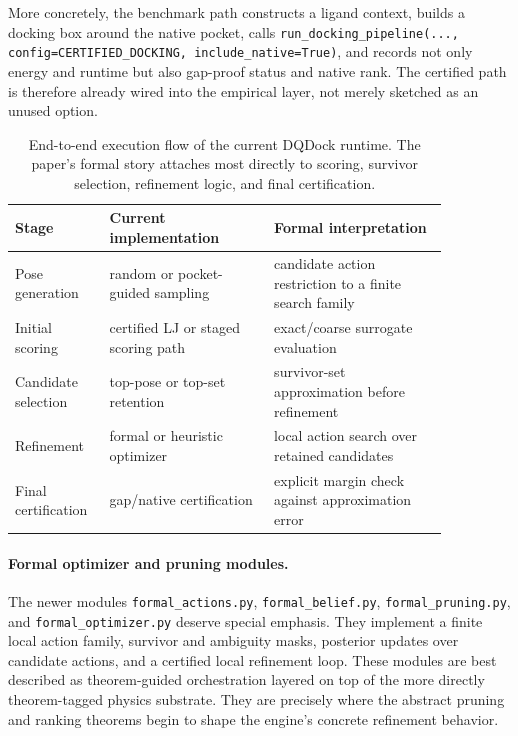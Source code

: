 More concretely, the benchmark path constructs a ligand context, builds a docking box around the native pocket, calls \texttt{run\_docking\_pipeline(..., config=CERTIFIED\_DOCKING, include\_native=True)}, and records not only energy and runtime but also gap-proof status and native rank. The certified path is therefore already wired into the empirical layer, not merely sketched as an unused option.

\begin{table}[t]
\centering
\small
\begin{tabular}{@{}p{0.16\linewidth}p{0.34\linewidth}p{0.36\linewidth}@{}}
\toprule
\textbf{Stage} & \textbf{Current implementation} & \textbf{Formal interpretation} \\
\midrule
Pose generation & random or pocket-guided sampling & candidate action restriction to a finite search family \\
Initial scoring & certified LJ or staged scoring path & exact/coarse surrogate evaluation \\
Candidate selection & top-pose or top-set retention & survivor-set approximation before refinement \\
Refinement & formal or heuristic optimizer & local action search over retained candidates \\
Final certification & gap/native certification & explicit margin check against approximation error \\
\bottomrule
\end{tabular}
\caption{End-to-end execution flow of the current DQDock runtime. The paper's formal story attaches most directly to scoring, survivor selection, refinement logic, and final certification.}
\end{table}

\paragraph{Formal optimizer and pruning modules.}
The newer modules \texttt{formal\_actions.py}, \texttt{formal\_belief.py}, \texttt{formal\_pruning.py}, and \texttt{formal\_optimizer.py} deserve special emphasis. They implement a finite local action family, survivor and ambiguity masks, posterior updates over candidate actions, and a certified local refinement loop. These modules are best described as theorem-guided orchestration layered on top of the more directly theorem-tagged physics substrate. They are precisely where the abstract pruning and ranking theorems begin to shape the engine's concrete refinement behavior.

